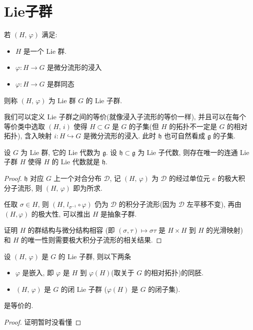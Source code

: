 \section{Lie子群}
    \begin{definition}
        若 $(H,\,\varphi)$ 满足:
        \begin{itemize}
            \item $H$ 是一个 $\mathrm{Lie}$ 群.
            \item $\varphi:H\rightarrow G$ 是微分流形的浸入
            \item $\varphi:H\rightarrow G$ 是群同态
        \end{itemize}
        则称 $(H,\,\varphi)$ 为 $\mathrm{Lie}$ 群 $G$ 的 $\mathrm{Lie}$ 子群.
    \end{definition}
    \begin{remark}
        我们可以定义 $\mathrm{Lie}$ 子群之间的等价(就像浸入子流形的等价一样),
        并且可以在每个等价类中选取 $(H,\,i)$ 使得 
        $H\subset G$ 是 $G$ 的子集(但 $H$ 的拓扑不一定是 $G$ 的相对拓扑), 
        含入映射 $i:H\hookrightarrow G$ 是微分流形的浸入.
        此时 $\mathfrak{h}$ 也可自然看成 $\mathfrak{g}$ 的子集.
    \end{remark}
    \begin{theorem}[Lie子代数与连通Lie子群的一一对应]
        设 $G$ 为 $\mathrm{Lie}$ 群, 它的 $\mathrm{Lie}$ 代数为 $\mathfrak{g}$. 
        设 $\mathfrak{h}\subset\mathfrak{g}$ 为 $\mathrm{Lie}$ 子代数,
        则存在唯一的连通 $\mathrm{Lie}$ 子群 $H$ 使得 
        $H$ 的 $\mathrm{Lie}$ 代数就是 $\mathfrak{h}$.
    \end{theorem}
    \begin{proof}
        $\mathfrak{h}$ 对应 $G$ 上一个对合分布 $\mathcal{D}$, 
        记 $(H,\,\varphi)$ 为 $\mathcal{D}$ 的经过单位元 $e$ 的极大积分子流形, 
        则 $(H,\,\varphi)$ 即为所求.
        
        任取 $\sigma\in H$, 则 $(H,\,l_{\sigma^{-1}}\circ\varphi)$ 仍为 
        $\mathcal{D}$ 的积分子流形(因为 $\mathcal{D}$ 左平移不变), 
        再由 $(H,\varphi)$ 的极大性, 可以推出 $H$ 是抽象子群.
        
        证明 $H$ 的群结构与微分结构相容
        (即 $(\sigma,\tau)\mapsto\sigma\tau$ 是 $H\times H$ 到 $H$ 的光滑映射) 
        和 $H$ 的唯一性则需要极大积分子流形的相关结果.
    \end{proof}
    \begin{theorem}[闭Lie子群与正则子流形的关系]
        设 $(H,\,\varphi)$ 是 $G$ 的 $\mathrm{Lie}$ 子群, 则以下两条
        \begin{itemize}
            \item $\varphi$ 是嵌入, 
            即 $\varphi$ 是 $H$ 到 $\varphi(H)$(取关于 $G$ 的相对拓扑)的同胚.
            \item $(H,\,\varphi)$ 是 $G$ 的闭 $\mathrm{Lie}$ 子群
            ($\varphi(H)$ 是 $G$ 的闭子集).
        \end{itemize}
        是等价的.
    \end{theorem}
    \begin{proof}
        证明暂时没看懂
    \end{proof}

